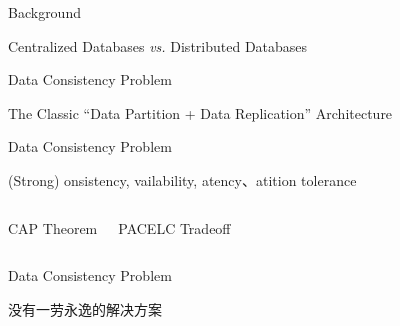 
\begin{frame}{Background}
	\begin{center}
		Centralized Databases \emph{vs.} Distributed Databases

	\end{center}
\end{frame}

\begin{frame}{Data Consistency Problem}
	\begin{center}
		The Classic ``Data Partition + Data Replication'' Architecture

		\pause
	\end{center}
\end{frame}

\begin{frame}{Data Consistency Problem}
	\begin{center}
		(Strong) \underline{}onsistency, \underline{}vailability,
		\underline{}atency、\underline{}atition tolerance
	\end{center}
	\begin{columns}[c]
		\begin{center}
			CAP Theorem \\[2pt]
		\end{center}
		\begin{center}

			\vspace{0.50cm}
			PACELC Tradeoff \\[2pt]
		\end{center}
	\end{columns}
\end{frame}

\begin{frame}{Data Consistency Problem}
	\begin{center}

		\vspace{0.30cm}
		没有一劳永逸的解决方案
	\end{center}
\end{frame}

